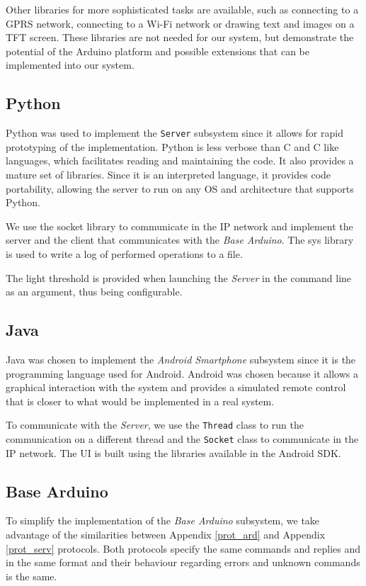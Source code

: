 \documentclass[conference, a4paper]{IEEEtran}
\begin{document}
Other libraries for more sophisticated tasks are available, such as connecting to a GPRS network, connecting to a Wi-Fi network or drawing text and images on a TFT screen. These libraries are not needed for our system, but demonstrate the potential of the Arduino platform and possible extensions that can be implemented into our system.

\subsection{Python}

Python was used to implement the \texttt{Server} subsystem since it allows for rapid prototyping of the implementation. Python is less verbose than C and C like languages, which facilitates reading and maintaining the code. It also provides a mature set of libraries. Since it is an interpreted language, it provides code portability, allowing the server to run on any OS and architecture that supports Python.

We use the socket library to communicate in the IP network and implement the server and the client that communicates with the \textit{Base Arduino}. The sys library is used to write a log of performed operations to a file.

The light threshold is provided when launching the \textit{Server} in the command line as an argument, thus being configurable.

\subsection{Java}

Java was chosen to implement the \textit{Android Smartphone} subsystem since it is the programming language used for Android. Android was chosen because it allows a graphical interaction with the system and provides a simulated remote control that is closer to what would be implemented in a real system.

To communicate with the \textit{Server}, we use the \texttt{Thread} class to run the communication on a different thread and the \texttt{Socket} class to communicate in the IP network. The UI is built using the libraries available in the Android SDK.

\subsection{Base Arduino}

To simplify the implementation of the \textit{Base Arduino} subsystem, we take advantage of the similarities between Appendix \ref{prot_ard} and Appendix \ref{prot_serv} protocols. Both protocols specify the same commands and replies and in the same format and their behaviour regarding errors and unknown commands is the same.
\end{document}
